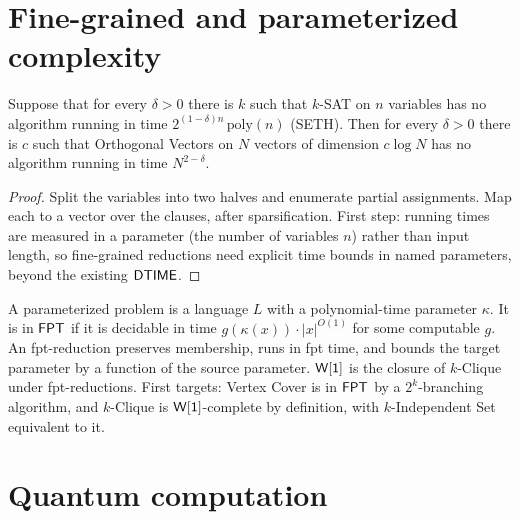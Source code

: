 \section{Fine-grained and parameterized complexity}

\begin{theorem}
  \label{thm:frontiers-seth-ov}
  \notready
  Suppose that for every $\delta > 0$ there is $k$ such that $k$-SAT on $n$
  variables has no algorithm running in time $2^{(1-\delta)n}\,\mathrm{poly}(n)$
  (SETH). Then for every $\delta > 0$ there is $c$ such that Orthogonal Vectors on
  $N$ vectors of dimension $c \log N$ has no algorithm running in time
  $N^{2-\delta}$.
\end{theorem}
\begin{proof}
  Split the variables into two halves and enumerate partial assignments. Map each
  to a vector over the clauses, after sparsification. First step: running times
  are measured in a parameter (the number of variables $n$) rather than input
  length, so fine-grained reductions need explicit time bounds in named
  parameters, beyond the existing $\mathsf{DTIME}$.
\end{proof}

\begin{definition}
  \label{def:frontiers-fpt}
  A parameterized problem is a language $L$ with a polynomial-time parameter
  $\kappa$. It is in $\mathsf{FPT}$ if it is decidable in time
  $g(\kappa(x)) \cdot |x|^{O(1)}$ for some computable $g$. An fpt-reduction
  preserves membership, runs in fpt time, and bounds the target parameter by a
  function of the source parameter. $\mathsf{W[1]}$ is the closure of $k$-Clique
  under fpt-reductions. First targets: Vertex Cover is in $\mathsf{FPT}$ by a
  $2^k$-branching algorithm, and $k$-Clique is $\mathsf{W[1]}$-complete by
  definition, with $k$-Independent Set equivalent to it.
\end{definition}

\section{Quantum computation}

